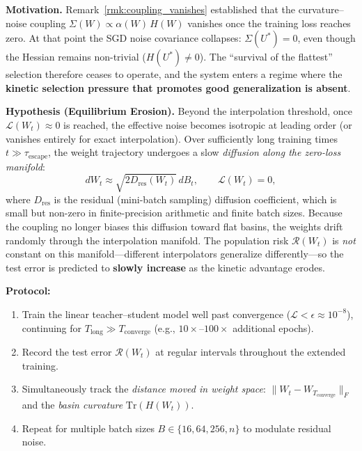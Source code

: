 \documentclass[
  journal=largetwo,
  year=2025,
  volume=37,
]{cup-journal}
\begin{document}
\textbf{Motivation.}
Remark~\ref{rmk:coupling_vanishes} established that the curvature--noise coupling $\Sigma(W) \propto \alpha(W)\,H(W)$ vanishes once the training loss reaches zero. At that point the SGD noise covariance collapses: $\Sigma(U^*) = 0$, even though the Hessian remains non-trivial ($H(U^*) \neq 0$). The ``survival of the flattest'' selection therefore ceases to operate, and the system enters a regime where the \textbf{kinetic selection pressure that promotes good generalization is absent}.

\textbf{Hypothesis (Equilibrium Erosion).}
Beyond the interpolation threshold, once $\mathcal{L}(W_t) \approx 0$ is reached, the effective noise becomes isotropic at leading order (or vanishes entirely for exact interpolation). Over sufficiently long training times $t \gg \tau_{\mathrm{escape}}$, the weight trajectory undergoes a slow \emph{diffusion along the zero-loss manifold}:
\begin{equation}\label{eq:erosion_diffusion}
    dW_t \approx \sqrt{2D_{\mathrm{res}}(W_t)}\,dB_t, \qquad \mathcal{L}(W_t) = 0,
\end{equation}
where $D_{\mathrm{res}}$ is the residual (mini-batch sampling) diffusion coefficient, which is small but non-zero in finite-precision arithmetic and finite batch sizes. Because the coupling no longer biases this diffusion toward flat basins, the weights drift randomly through the interpolation manifold. The population risk $\mathcal{R}(W_t)$ is \emph{not} constant on this manifold---different interpolators generalize differently---so the test error is predicted to \textbf{slowly increase} as the kinetic advantage erodes.

\textbf{Protocol:}
\begin{enumerate}
    \item Train the linear teacher--student model well past convergence ($\mathcal{L} < \epsilon \approx 10^{-8}$), continuing for $T_{\mathrm{long}} \gg T_{\mathrm{converge}}$ (e.g., $10\times$--$100\times$ additional epochs).
    \item Record the test error $\mathcal{R}(W_t)$ at regular intervals throughout the extended training.
    \item Simultaneously track the \emph{distance moved in weight space}: $\|W_t - W_{T_{\mathrm{converge}}}\|_F$ and the \emph{basin curvature} $\mathrm{Tr}(H(W_t))$.
    \item Repeat for multiple batch sizes $B \in \{16, 64, 256, n\}$ to modulate residual noise.
\end{enumerate}
\end{document}
